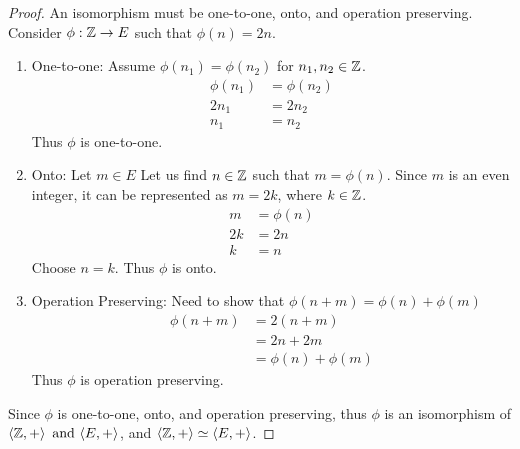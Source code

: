 \documentclass{article}
\begin{document}
\begin{proof}
    An isomorphism must be one-to-one, onto, and operation preserving. Consider $\phi:  \mathbb{Z} \rightarrow E$ such that $\phi(n) = 2n$.
    \begin{enumerate}
        \item One-to-one: Assume $\phi(n_1) = \phi(n_2)$ for $n_1,n_2 \in \mathbb{Z}$.
              \begin{align*}
                  \phi(n_1) & = \phi(n_2) \\
                  2n_1      & = 2n_2      \\
                  n_1       & = n_2
              \end{align*}
              Thus $\phi$ is one-to-one.
        \item Onto: Let $m \in E$ Let us find $n \in \mathbb{Z}$ such that $m = \phi(n)$. Since $m$ is an even integer, it can be represented as $m = 2k$, where $k \in \mathbb{Z}$.
              \begin{align*}
                  m  & = \phi(n) \\
                  2k & = 2n      \\
                  k & = n
              \end{align*}
              Choose $n = k$. Thus $\phi$ is onto.
        \item Operation Preserving: Need to show that $\phi(n + m) = \phi(n) + \phi(m)$
              \begin{align*}
                  \phi(n + m) & = 2(n+m)            \\
                              & = 2n + 2m           \\
                              & = \phi(n) + \phi(m)
              \end{align*}
              Thus $\phi$ is operation preserving.
    \end{enumerate}
    Since $\phi$ is one-to-one, onto, and operation preserving, thus $\phi$ is an isomorphism of $\langle \mathbb{Z},+ \rangle \operatorname{~\text{and}~} \langle E,+ \rangle$, and $\langle \mathbb{Z},+ \rangle \simeq \langle E,+ \rangle$.
\end{proof}
\qdash
\end{document}
